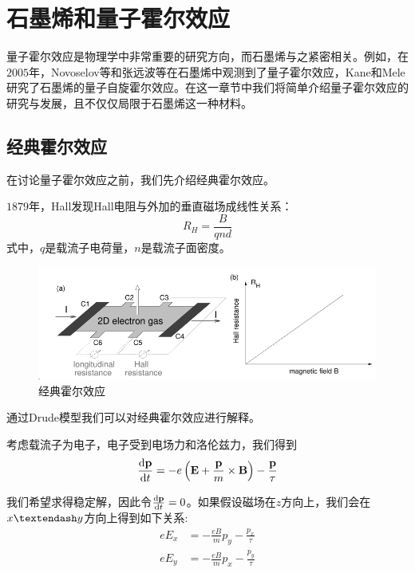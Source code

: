
\chapter{石墨烯和量子霍尔效应}


量子霍尔效应是物理学中非常重要的研究方向，而石墨烯与之紧密相关。例如，在$2005$年，Novoselov等\cite{RN18}和张远波等\cite{RN19}在石墨烯中观测到了量子霍尔效应，Kane和Mele研究了石墨烯的量子自旋霍尔效应\cite{RN20}。在这一章节中我们将简单介绍量子霍尔效应的研究与发展，且不仅仅局限于石墨烯这一种材料。

\section{经典霍尔效应}

在讨论量子霍尔效应之前，我们先介绍经典霍尔效应。

$1879$年，Hall发现Hall电阻与外加的垂直磁场成线性关系\cite{RN21}：
\begin{equation}
    R_H=\frac{B}{qnd}
\end{equation}
式中，$q$是载流子电荷量，$n$是载流子面密度。

\begin{figure}
    \centering
    \includegraphics[scale=0.5]{img/Hall}
    \caption{经典霍尔效应}
\end{figure}

通过Drude模型我们可以对经典霍尔效应进行解释。

考虑载流子为电子，电子受到电场力和洛伦兹力，我们得到
\begin{equation}
    \dv{\vb p}{t}=-e\left(\vb E+\frac{\vb p}{m}\times\vb B\right)-\frac{\vb p}{\tau}
\end{equation}

我们希望求得稳定解，因此令$\dv{\vb p}{t}=0$。如果假设磁场在$z$方向上，我们会在$x\textendash y$方向上得到如下关系:
\begin{align*}
    eE_x & = -\frac{eB}{m}p_y-\frac{p_x}{\tau} \\
    eE_y & = -\frac{eB}{m}p_x-\frac{p_y}{\tau}
\end{align*}

